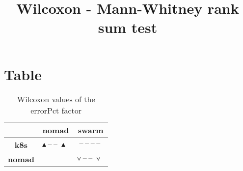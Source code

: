 \documentclass{article}
\title{Wilcoxon - Mann-Whitney rank sum test}
\author{}
\begin{document}
\maketitle
\section{Table}
\begin{table}[!htp]
  \caption{Wilcoxon values of the errorPct factor}
  \label{table:errorPct}
  \centering
  \begin{scriptsize}
  \begin{tabular}{c|cc}
      & \textbf{nomad} & \textbf{swarm} \\\hline
      \textbf{k8s} & $\blacktriangle\ \text{--}\ \text{--}\ \blacktriangle\  $ & $ \text{--}\ \text{--}\ \text{--}\ \text{--}\ $ \\
      \textbf{nomad} & $ $ & $ \triangledown\ \text{--}\ \text{--}\ \triangledown\ $ \\
  \end{tabular}
  \end{scriptsize}
\end{table}
\end{document}
